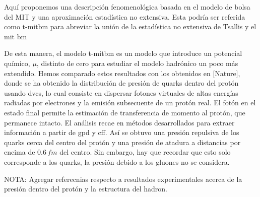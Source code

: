 
Aquí proponemos una descripción fenomenológica basada en el modelo de bolsa del MIT \cite{Chodos_1974,Chodos1974a} y una aproximación estadística no extensiva. Esta podría ser referida como \acrshort{t-mitbm} para abreviar la unión de la estadística no extensiva de Tsallis y el \acrshort{mit} \acrshort{bm} \cite{Barboza_Mendoza_2019}

De esta manera, el modelo \acrshort{t-mitbm} es un modelo que introduce un potencial químico, $\mu$, distinto de cero para estudiar el modelo hadrónico un poco más extendido. Hemos comparado estos resultados con los obtenidos en [Nature], donde se ha obtenido la distribución de presión de quarks dentro del protón usando \acrfull{dvcs}, lo cual consiste en dispersar fotones virtuales de altas energías radiadas por electrones y la emisión subsecuente de un protón real. El fotón en el estado final permite la estimación de transferencia de momento al protón, que permanece intacto. El análisis recae en métodos desarrollados para extraer información a partir de \acrfull{gpd} y \acrfull{cff}. Así se obtuvo una presión repulsiva de los quarks cerca del centro del protón y una presión de atadura a distancias por encima de $0.6 \, \mathit{\unit{\femto\meter}}$ del centro. Sin embargo, hay que recordar que esto solo corresponde a los quarks, la presión debido a los gluones no se considera.

NOTA: Agregar referecnias respecto a resultados experimentales acerca de la presión dentro del protón y la estructura del hadron.


